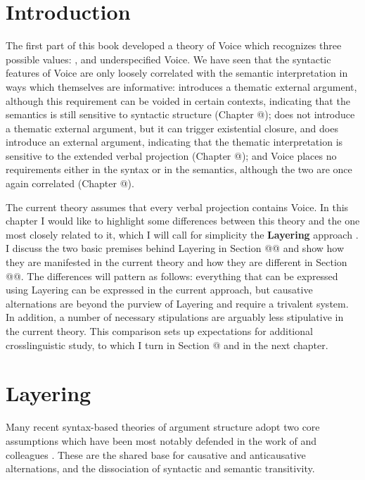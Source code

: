 \label{chap:aas}
\section{Introduction} \label{sec:intro}
The first part of this book developed a theory of Voice which recognizes three possible values: {\vd}, {\vz} and underspecified Voice. We have seen that the syntactic features of Voice are only loosely correlated with the semantic interpretation in ways which themselves are informative: {\vd} introduces a thematic external argument, although this requirement can be voided in certain contexts, indicating that the semantics is still sensitive to syntactic structure (Chapter @); {\vz} does not introduce a thematic external argument, but it can trigger existential closure, and {\pz} does introduce an external argument, indicating that the thematic interpretation is sensitive to the extended verbal projection (Chapter @); and Voice places no requirements either in the syntax or in the semantics, although the two are once again correlated (Chapter @).

The current theory assumes that every verbal projection contains Voice. In this chapter I would like to highlight some differences between this theory and the one most closely related to it, which I will call for simplicity the \textbf{Layering} approach \citep{schaefer08,layering15}. I discuss the two basic premises behind Layering in Section @@ and show how they are manifested in the current theory and how they are different in Section @@. The differences will pattern as follows: everything that can be expressed using Layering can be expressed in the current approach, but causative alternations are beyond the purview of Layering and require a trivalent system. In addition, a number of necessary stipulations are arguably less stipulative in the current theory. This comparison sets up expectations for additional crosslinguistic study, to which I turn in Section @ and in the next chapter.


\section{Layering}
Many recent syntax-based theories of argument structure adopt two core assumptions which have been most notably defended in the work of \cite{schaefer08} and colleagues \citep{alexiadouetal06,layering15}. These are the shared base for causative and anticausative alternations, and the dissociation of syntactic and semantic transitivity.

